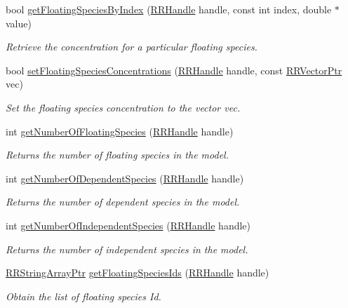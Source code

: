 \begin{DoxyCompactItemize}
bool \hyperlink{group__floating_ga4f8f8270363e5545c94f7b434319807b}{get\+Floating\+Species\+By\+Index} (\hyperlink{rrc__types_8h_a1d68f0592372208fa5a5f2799ea4b3ae}{R\+R\+Handle} handle, const int index, double $\ast$value)
\begin{DoxyCompactList}\small\item\em Retrieve the concentration for a particular floating species. \end{DoxyCompactList}\item 
bool \hyperlink{group__floating_gaf0efd671999c1689be3614e4af162bc2}{set\+Floating\+Species\+Concentrations} (\hyperlink{rrc__types_8h_a1d68f0592372208fa5a5f2799ea4b3ae}{R\+R\+Handle} handle, const \hyperlink{rrc__types_8h_a3be72d6006034fd349f753d2bf441bf7}{R\+R\+Vector\+Ptr} vec)
\begin{DoxyCompactList}\small\item\em Set the floating species concentration to the vector vec. \end{DoxyCompactList}\item 
int \hyperlink{group__floating_ga71c45e94c31e5632a3c4815da05bec9a}{get\+Number\+Of\+Floating\+Species} (\hyperlink{rrc__types_8h_a1d68f0592372208fa5a5f2799ea4b3ae}{R\+R\+Handle} handle)
\begin{DoxyCompactList}\small\item\em Returns the number of floating species in the model. \end{DoxyCompactList}\item 
int \hyperlink{group__floating_ga6038680c2da9d284277d9b73bb0c2a40}{get\+Number\+Of\+Dependent\+Species} (\hyperlink{rrc__types_8h_a1d68f0592372208fa5a5f2799ea4b3ae}{R\+R\+Handle} handle)
\begin{DoxyCompactList}\small\item\em Returns the number of dependent species in the model. \end{DoxyCompactList}\item 
int \hyperlink{group__floating_ga2c4d57dbedac2ccdf4ee9605d6a53932}{get\+Number\+Of\+Independent\+Species} (\hyperlink{rrc__types_8h_a1d68f0592372208fa5a5f2799ea4b3ae}{R\+R\+Handle} handle)
\begin{DoxyCompactList}\small\item\em Returns the number of independent species in the model. \end{DoxyCompactList}\item 
\hyperlink{rrc__types_8h_a7c9475df6c7337d99482b13a365e7596}{R\+R\+String\+Array\+Ptr} \hyperlink{group__floating_ga18277715f5f3df21eaee5f99d65ed7b7}{get\+Floating\+Species\+Ids} (\hyperlink{rrc__types_8h_a1d68f0592372208fa5a5f2799ea4b3ae}{R\+R\+Handle} handle)
\begin{DoxyCompactList}\small\item\em Obtain the list of floating species Id. \end{DoxyCompactList}\end{DoxyCompactItemize}


